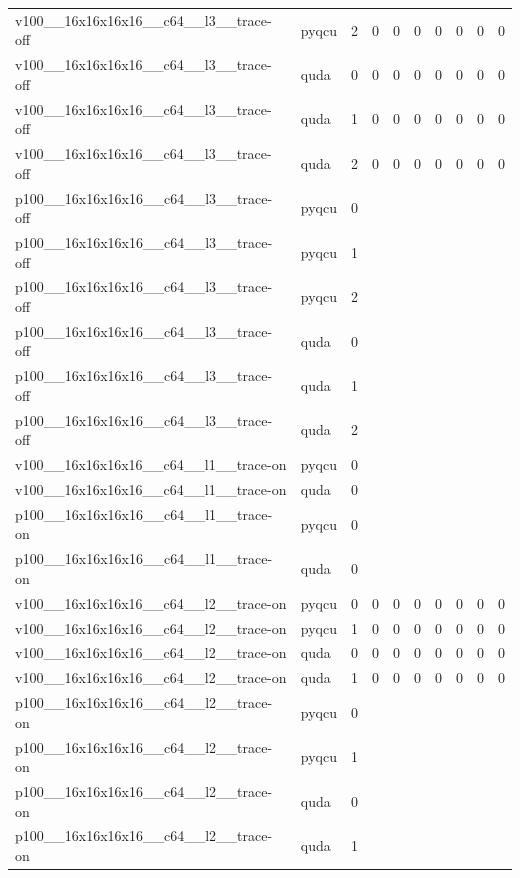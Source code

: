 \begin{table}[htbp]
\begin{tabular}{@{}llrrrrrrrr@{}}
v100\_\_16x16x16x16\_\_c64\_\_l3\_\_trace-off & pyqcu & 2 & 0 & 0 & 0 & 0 & 0 & 0 & 0 \\
v100\_\_16x16x16x16\_\_c64\_\_l3\_\_trace-off & quda & 0 & 0 & 0 & 0 & 0 & 0 & 0 & 0 \\
v100\_\_16x16x16x16\_\_c64\_\_l3\_\_trace-off & quda & 1 & 0 & 0 & 0 & 0 & 0 & 0 & 0 \\
v100\_\_16x16x16x16\_\_c64\_\_l3\_\_trace-off & quda & 2 & 0 & 0 & 0 & 0 & 0 & 0 & 0 \\
p100\_\_16x16x16x16\_\_c64\_\_l3\_\_trace-off & pyqcu & 0 &  &  &  &  &  &  &  \\
p100\_\_16x16x16x16\_\_c64\_\_l3\_\_trace-off & pyqcu & 1 &  &  &  &  &  &  &  \\
p100\_\_16x16x16x16\_\_c64\_\_l3\_\_trace-off & pyqcu & 2 &  &  &  &  &  &  &  \\
p100\_\_16x16x16x16\_\_c64\_\_l3\_\_trace-off & quda & 0 &  &  &  &  &  &  &  \\
p100\_\_16x16x16x16\_\_c64\_\_l3\_\_trace-off & quda & 1 &  &  &  &  &  &  &  \\
p100\_\_16x16x16x16\_\_c64\_\_l3\_\_trace-off & quda & 2 &  &  &  &  &  &  &  \\
v100\_\_16x16x16x16\_\_c64\_\_l1\_\_trace-on & pyqcu & 0 &  &  &  &  &  &  &  \\
v100\_\_16x16x16x16\_\_c64\_\_l1\_\_trace-on & quda & 0 &  &  &  &  &  &  &  \\
p100\_\_16x16x16x16\_\_c64\_\_l1\_\_trace-on & pyqcu & 0 &  &  &  &  &  &  &  \\
p100\_\_16x16x16x16\_\_c64\_\_l1\_\_trace-on & quda & 0 &  &  &  &  &  &  &  \\
v100\_\_16x16x16x16\_\_c64\_\_l2\_\_trace-on & pyqcu & 0 & 0 & 0 & 0 & 0 & 0 & 0 & 0 \\
v100\_\_16x16x16x16\_\_c64\_\_l2\_\_trace-on & pyqcu & 1 & 0 & 0 & 0 & 0 & 0 & 0 & 0 \\
v100\_\_16x16x16x16\_\_c64\_\_l2\_\_trace-on & quda & 0 & 0 & 0 & 0 & 0 & 0 & 0 & 0 \\
v100\_\_16x16x16x16\_\_c64\_\_l2\_\_trace-on & quda & 1 & 0 & 0 & 0 & 0 & 0 & 0 & 0 \\
p100\_\_16x16x16x16\_\_c64\_\_l2\_\_trace-on & pyqcu & 0 &  &  &  &  &  &  &  \\
p100\_\_16x16x16x16\_\_c64\_\_l2\_\_trace-on & pyqcu & 1 &  &  &  &  &  &  &  \\
p100\_\_16x16x16x16\_\_c64\_\_l2\_\_trace-on & quda & 0 &  &  &  &  &  &  &  \\
p100\_\_16x16x16x16\_\_c64\_\_l2\_\_trace-on & quda & 1 &  &  &  &  &  &  &  \\

\end{tabular}
\end{table}
